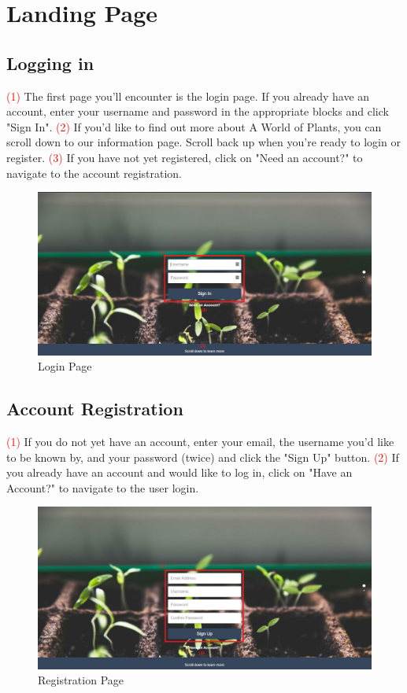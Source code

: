 \documentclass{article}
\begin{document}
\section{Landing Page}
	\subsection{Logging in}
		\textcolor{red}{(1)} The first page you'll encounter is the login page. If you already have an account, enter your username and password in the appropriate blocks and click "Sign In".
		\newline
		\textcolor{red}{(2)} If you'd like to find out more about A World of Plants, you can scroll down to our information page. Scroll back up when you're ready to login or register.
		\newline
		\textcolor{red}{(3)} If you have not yet registered, click on "Need an account?" to navigate to the account registration.
		\begin{figure}[H]
			\includegraphics[width=\textwidth]{../images/UserManual/login.PNG}
			\caption{Login Page}
		\end{figure}				
		
	\subsection{Account Registration}
		\textcolor{red}{(1)} If you do not yet have an account, enter your email, the username you'd like to be known by, and your password (twice) and click the "Sign Up" button.
		\newline
		\textcolor{red}{(2)} If you already have an account and would like to log in, click on "Have an Account?" to navigate to the user login.
		\newline
		\begin{figure}[H]
			\includegraphics[width=\textwidth]{../images/UserManual/registration.PNG}
			\caption{Registration Page}
		\end{figure}
		
\end{document}
